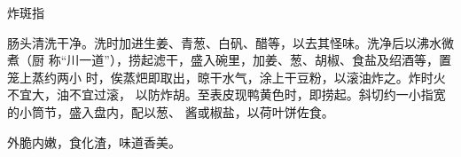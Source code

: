 \begin{recipe}{炸斑指}

\ingredients


\preparation

肠头清洗干净。洗时加进生姜、青葱、白矾、醋等，以去其怪味。洗净后以沸水微煮（厨
称“川一道”），捞起滤干，盛入碗里，加姜、葱、胡椒、食盐及绍酒等，置笼上蒸约两小
时，俟蒸𤆵即取出，晾干水气，涂上干豆粉，以滚油炸之。炸时火不宜大，油不宜过滚，
以防炸胡。至表皮现鸭黄色时，即捞起。斜切约一小指宽的小筒节，盛入盘内，配以葱、
酱或椒盐，以荷叶饼佐食。

\features

外脆内嫩，食化渣，味道香美。

\end{recipe}

